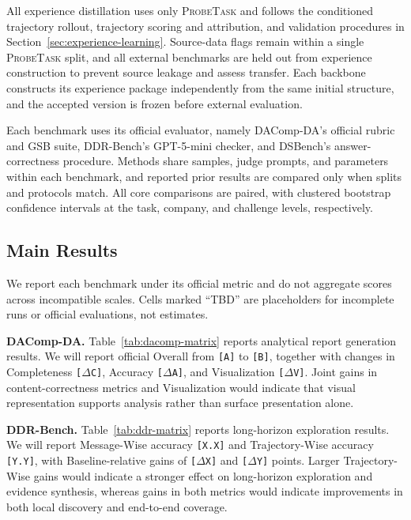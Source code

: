 \documentclass{article}
\newcommand{\probe}{\textsc{ProbeTask}}
\begin{document}
All experience distillation uses only \probe{} and follows the conditioned trajectory rollout, trajectory scoring and attribution, and validation procedures in Section~\ref{sec:experience-learning}.
Source-data flags remain within a single \probe{} split, and all external benchmarks are held out from experience construction to prevent source leakage and assess transfer.
Each backbone constructs its experience package independently from the same initial structure, and the accepted version is frozen before external evaluation.

Each benchmark uses its official evaluator, namely DAComp-DA's official rubric and GSB suite, DDR-Bench's GPT-5-mini checker, and DSBench's answer-correctness procedure.
Methods share samples, judge prompts, and parameters within each benchmark, and reported prior results are compared only when splits and protocols match.
All core comparisons are paired, with clustered bootstrap confidence intervals at the task, company, and challenge levels, respectively.

\subsection{Main Results}
\label{sec:main-results}

We report each benchmark under its official metric and do not aggregate scores across incompatible scales.
Cells marked ``TBD'' are placeholders for incomplete runs or official evaluations, not estimates.

\noindent\textbf{DAComp-DA.}
Table~\ref{tab:dacomp-matrix} reports analytical report generation results.
We will report official Overall from \texttt{[A]} to \texttt{[B]}, together with changes in Completeness \texttt{[$\Delta$C]}, Accuracy \texttt{[$\Delta$A]}, and Visualization \texttt{[$\Delta$V]}.
Joint gains in content-correctness metrics and Visualization would indicate that visual representation supports analysis rather than surface presentation alone.

\noindent\textbf{DDR-Bench.}
Table~\ref{tab:ddr-matrix} reports long-horizon exploration results.
We will report Message-Wise accuracy \texttt{[X.X]} and Trajectory-Wise accuracy \texttt{[Y.Y]}, with Baseline-relative gains of \texttt{[$\Delta$X]} and \texttt{[$\Delta$Y]} points.
Larger Trajectory-Wise gains would indicate a stronger effect on long-horizon exploration and evidence synthesis, whereas gains in both metrics would indicate improvements in both local discovery and end-to-end coverage.
\end{document}
